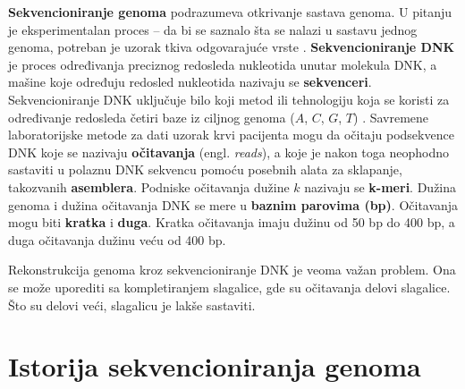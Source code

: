 \documentclass[12pt,oneside]{memoir}
\begin{document}
\textbf{Sekvencioniranje genoma} podrazumeva otkrivanje sastava genoma. U pitanju je eksperimentalan
proces – da bi se saznalo šta se nalazi u sastavu jednog genoma, potreban je uzorak tkiva
odgovarajuće vrste \cite{skriptaBio}. \textbf{Sekvencioniranje DNK} je proces određivanja preciznog redosleda nukleotida unutar molekula DNK, a mašine koje određuju redosled nukleotida nazivaju se \textbf{sekvenceri}. Sekvencioniranje DNK uključuje bilo koji metod ili tehnologiju koja se koristi za određivanje redosleda četiri baze iz ciljnog genoma ($A$, $C$, $G$, $T$) \cite{DataAlgorithms}. Savremene laboratorijske metode za dati uzorak krvi pacijenta mogu da očitaju podsekvence DNK koje se nazivaju \textbf{očitavanja} (engl. \textit{reads}), a koje je nakon toga neophodno sastaviti u polaznu DNK sekvencu pomoću posebnih alata za sklapanje, takozvanih \textbf{asemblera}. Podniske očitavanja dužine $k$ nazivaju se \textbf{k-meri}. Dužina genoma i dužina očitavanja DNK se mere u \textbf{baznim parovima (bp)}. Očitavanja mogu biti  \textbf{kratka} i \textbf{duga}. Kratka očitavanja imaju dužinu od 50 bp do 400 bp, a duga očitavanja dužinu veću od 400 bp.

Rekonstrukcija genoma kroz sekvencioniranje DNK je veoma važan problem. Ona se može uporediti sa kompletiranjem slagalice, gde su očitavanja delovi slagalice. Što su delovi veći, slagalicu je lakše sastaviti.

\begin{comment}
Rekonstrukcija genoma kroz sekvencioniranje DNK je veoma važan problem u genomici. Postojeće biotehnologije ne mogu proći kroz ceo hromozom, jer je predugačak. Umesto toga, genom se rekonstruiše indirektno. Prvo, vrši se razbijanje genoma na DNK fragmente koristeći pristup očitavanja celog sekvencioniranog genoma (engl. \textit{whole genome shotgun approach}). Zatim se pomoću mašine za sekvencioniranje na osnovu fragmenata vrši dekodiranje DNK sekvence. Ove DNK sekvence se nazivaju \textbf{očitavanja (engl. \textit{reads})}. Usled slučajnog uzorkovanja , ekstahovana očitavanja pokrivaju ceo genom ravnomerno. Lepljenjem ovih očitavanja možemo računski rekonstruisati genom. Ovaj proces je poznat kao \textbf{genomsko sekvencioniranje \textit{de novo}}.
\end{comment}

\section{Istorija sekvencioniranja genoma}
\end{document}

